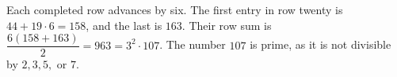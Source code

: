 Each completed row advances by six. The first entry in row twenty is $44+19\cdot6=158$, and the last is $163$. Their row sum is $\dfrac{6(158+163)}{2}=963=\boxed{3^2\cdot107}$. The number $107$ is prime, as it is not divisible by $2,3,5,$ or $7$.
